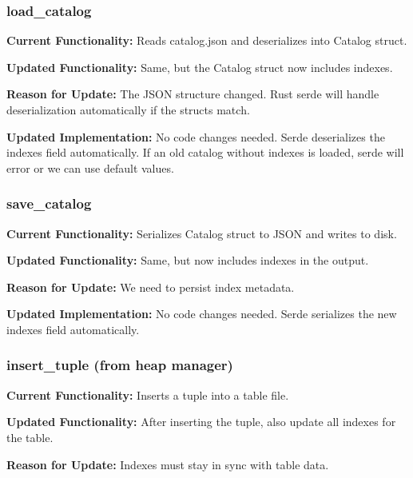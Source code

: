 \documentclass[11pt,a4paper]{article}
\begin{document}
\subsubsection{load\_catalog}

\textbf{Current Functionality:} Reads catalog.json and deserializes into Catalog struct.

\textbf{Updated Functionality:} Same, but the Catalog struct now includes indexes.

\textbf{Reason for Update:} The JSON structure changed. Rust serde will handle deserialization automatically if the structs match.

\textbf{Updated Implementation:} No code changes needed. Serde deserializes the indexes field automatically. If an old catalog without indexes is loaded, serde will error or we can use default values.

\subsubsection{save\_catalog}

\textbf{Current Functionality:} Serializes Catalog struct to JSON and writes to disk.

\textbf{Updated Functionality:} Same, but now includes indexes in the output.

\textbf{Reason for Update:} We need to persist index metadata.

\textbf{Updated Implementation:} No code changes needed. Serde serializes the new indexes field automatically.

\subsubsection{insert\_tuple (from heap manager)}

\textbf{Current Functionality:} Inserts a tuple into a table file.

\textbf{Updated Functionality:} After inserting the tuple, also update all indexes for the table.

\textbf{Reason for Update:} Indexes must stay in sync with table data.
\end{document}
